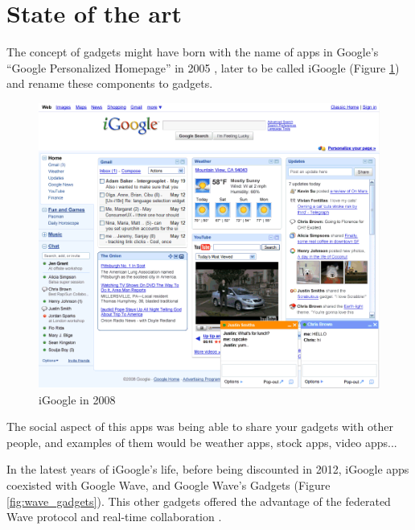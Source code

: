 \newpage
\section{State of the art}

The concept of gadgets might have born with the name of apps in Google's ``Google Personalized Homepage'' in 2005 \cite{ref:what_happened_to_igoogle}, later to be called iGoogle (Figure \ref{fig:igoogle_2008}) and rename these components to gadgets.

\begin{figure}[h]
  \center
    \includegraphics[keepaspectratio, scale=0.6]{Media/Captures/Soa/iGoogle.png}
  \caption{iGoogle in 2008}
  \label{fig:igoogle_2008}
\end{figure}

The social aspect of this apps was being able to share your gadgets with other people, and examples of them would be weather apps, stock apps, video apps...


In the latest years of iGoogle's life, before being discounted in 2012, iGoogle apps coexisted with Google Wave, and Google Wave's Gadgets (Figure \ref{fig:wave_gadgets}). This other gadgets offered the advantage of the federated Wave protocol and real-time collaboration \cite{ref:apache_wave_about}.

